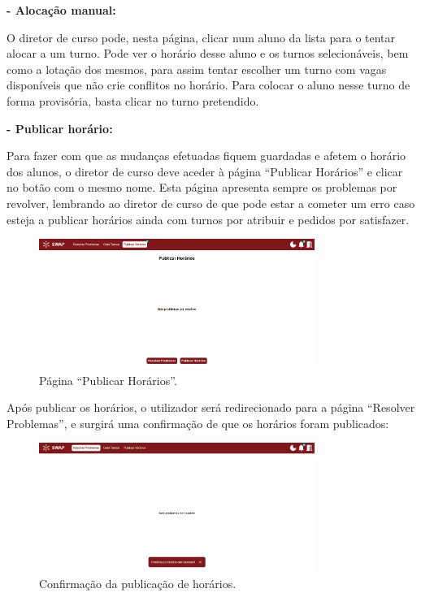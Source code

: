 \documentclass[12pt, a4paper]{article}
\begin{document}
\textbf{- Alocação manual:}

O diretor de curso pode, nesta página, clicar num aluno da lista para o tentar alocar a um turno.
Pode ver o horário desse aluno e os turnos selecionáveis, bem como a lotação dos mesmos, para assim
tentar escolher um turno com vagas disponíveis que não crie conflitos no horário. Para colocar o
aluno nesse turno de forma provisória, basta clicar no turno pretendido.

\textbf{- Publicar horário:}

Para fazer com que as mudanças efetuadas fiquem guardadas e afetem o horário dos alunos, o diretor
de curso deve aceder à página ``Publicar Horários'' e clicar no botão com o mesmo nome. Esta página
apresenta sempre os problemas por revolver, lembrando ao diretor de curso de que pode estar a
cometer um erro caso esteja a publicar horários ainda com turnos por atribuir e pedidos por
satisfazer.

\begin{figure}[H]
    \centering
    \includegraphics[width=0.8\textwidth]{res/manual/publicar_horario.png}
    \caption{Página ``Publicar Horários''.}
    \label{publicar_horarios}
\end{figure}

Após publicar os horários, o utilizador será redirecionado para a página ``Resolver Problemas'', e
surgirá uma confirmação de que os horários foram publicados:

\begin{figure}[H]
    \centering
    \includegraphics[width=0.8\textwidth]{res/manual/toast_horario_publicado.png}
    \caption{Confirmação da publicação de horários.}
    \label{toast_horario_publicado}
\end{figure}
\end{document}
